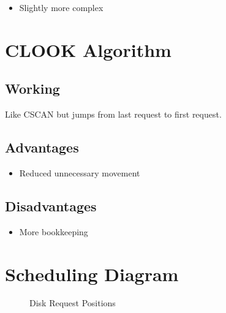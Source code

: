 \begin{itemize}
\item Slightly more complex
\end{itemize}

\section{CLOOK Algorithm}

\subsection{Working}

Like CSCAN but jumps from last request to first request.

\subsection{Advantages}

\begin{itemize}
\item Reduced unnecessary movement
\end{itemize}

\subsection{Disadvantages}

\begin{itemize}
\item More bookkeeping
\end{itemize}

\section{Scheduling Diagram}

\begin{figure}[h]
\centering
{}
\caption{Disk Request Positions}
\end{figure}

